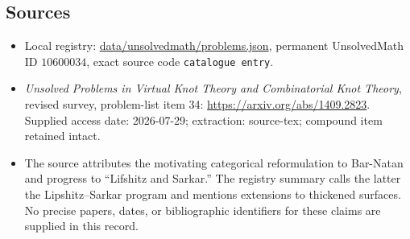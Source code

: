 \documentclass[11pt]{article}
\begin{document}
\subsection{Sources}
\begin{itemize}
\item Local registry: \url{data/unsolvedmath/problems.json}, permanent UnsolvedMath ID $10600034$, exact source code \texttt{catalogue entry}.
\item \emph{Unsolved Problems in Virtual Knot Theory and Combinatorial Knot Theory}, revised survey, problem-list item 34: \url{https://arxiv.org/abs/1409.2823}. Supplied access date: 2026-07-29; extraction: source-tex; compound item retained intact.
\item The source attributes the motivating categorical reformulation to Bar-Natan and progress to ``Lifshitz and Sarkar.'' The registry summary calls the latter the Lipshitz--Sarkar program and mentions extensions to thickened surfaces. No precise papers, dates, or bibliographic identifiers for these claims are supplied in this record.
\end{itemize}
\end{document}
